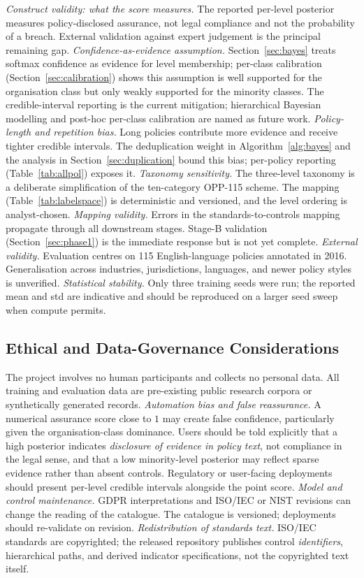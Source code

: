 \documentclass[final,3p,times,twocolumn]{elsarticle}
\begin{document}
	\emph{Construct validity: what the score measures.} The reported per-level
	posterior measures policy-disclosed assurance, not legal compliance and not the
	probability of a breach. External validation against expert judgement is the
	principal remaining gap. \emph{Confidence-as-evidence assumption.} Section~\ref{sec:bayes}
	treats softmax confidence as evidence for level membership; per-class calibration
	(Section~\ref{sec:calibration}) shows this assumption is well supported for the
	organisation class but only weakly supported for the minority classes. The
	credible-interval reporting is the current mitigation; hierarchical Bayesian modelling
	and post-hoc per-class calibration are named as future work. \emph{Policy-length
	and repetition bias.} Long policies contribute more evidence and receive tighter
	credible intervals. The deduplication weight in Algorithm~\ref{alg:bayes} and
	the analysis in Section~\ref{sec:duplication} bound this bias; per-policy reporting
	(Table~\ref{tab:allpol}) exposes it. \emph{Taxonomy sensitivity.} The three-level
	taxonomy is a deliberate simplification of the ten-category OPP-115 scheme.
	The mapping (Table~\ref{tab:labelspace}) is deterministic and versioned, and the
	level ordering is analyst-chosen. \emph{Mapping validity.} Errors in the standards-to-controls
	mapping propagate through all downstream stages. Stage-B validation (Section~\ref{sec:phase1})
	is the immediate response but is not yet complete. \emph{External validity.}
	Evaluation centres on 115 English-language policies annotated in 2016.
	Generalisation across industries, jurisdictions, languages, and newer policy styles
	is unverified. \emph{Statistical stability.} Only three training seeds were run;
	the reported mean and std are indicative and should be reproduced on a larger
	seed sweep when compute permits.

	\subsection{Ethical and Data-Governance Considerations}
	The project involves no human participants and collects no personal data. All training
	and evaluation data are pre-existing public research corpora or synthetically generated
	records. \emph{Automation bias and false reassurance.} A numerical assurance score
	close to $1$ may create false confidence, particularly given the organisation-class
	dominance. Users should be told explicitly that a high posterior indicates \emph{disclosure
	of evidence in policy text}, not compliance in the legal sense, and that a low
	minority-level posterior may reflect sparse evidence rather than absent
	controls. Regulatory or user-facing deployments should present per-level credible
	intervals alongside the point score. \emph{Model and control maintenance.} GDPR
	interpretations and ISO/IEC or NIST revisions can change the reading of the catalogue.
	The catalogue is versioned; deployments should re-validate on revision. \emph{Redistribution
	of standards text.} ISO/IEC standards are copyrighted; the released repository
	publishes control \emph{identifiers}, hierarchical paths, and derived indicator
	specifications, not the copyrighted text itself.
\end{document}
